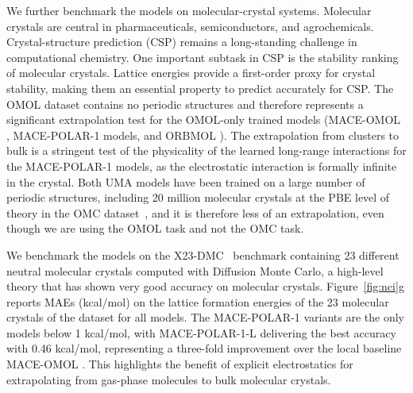 \documentclass[aps,%
superscriptaddress,
 amsmath,amssymb,
floatfix,
twocolumn
]{revtex4-2}
\newcommand{\MOMOL}{MACE-OMOL }
\newcommand{\MFP}{MACE-POLAR-1 }
\newcommand{\MFPL}{MACE-POLAR-1-L }
\newcommand{\ORBMOL}{ORBMOL }
\begin{document}
We further benchmark the models on molecular-crystal systems.
Molecular crystals are central in pharmaceuticals, semiconductors, and agrochemicals. Crystal-structure prediction (CSP) remains a long-standing challenge in computational chemistry. One important subtask in CSP is the stability ranking of molecular crystals.
Lattice energies provide a first-order proxy for crystal stability, making them an essential property to predict accurately for CSP.
The OMOL dataset contains no periodic structures and therefore represents a significant extrapolation test for the OMOL-only trained models (\MOMOL, \MFP models, and \ORBMOL). The extrapolation from clusters to bulk is a stringent test of the physicality of the learned long-range interactions for the \MFP models, as the electrostatic interaction is formally infinite in the crystal. Both UMA models have been trained on a large number of periodic structures, including 20 million molecular crystals at the PBE level of theory in the OMC dataset~\cite{gharakhanyan2025openmolecularcrystals2025}, and it is therefore less of an extrapolation, even though we are using the OMOL task and not the OMC task.

We benchmark the models on the X23-DMC~\cite{DellaPia2024} benchmark containing 23 different neutral molecular crystals computed with Diffusion Monte Carlo, a high-level theory that has shown very good accuracy on molecular crystals. 
Figure~\ref{fig:nci}g reports MAEs (kcal/mol) on the lattice formation energies of the 23 molecular crystals of the dataset for all models. The \MFP variants are the only models below 1 kcal/mol, with \MFPL delivering the best accuracy with 0.46 kcal/mol, representing a three-fold improvement over the local baseline \MOMOL. This highlights the benefit of explicit electrostatics for extrapolating from gas-phase molecules to bulk molecular crystals.
\end{document}
